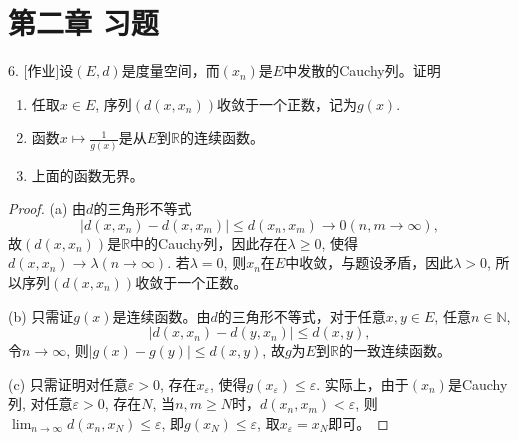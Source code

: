\documentclass[a4paper,8pt]{ctexart}\textwidth 140mm \textheight 216mm
\newtheorem{Def}{Def}[section]
\newcommand{\e}{\varepsilon}
\newcommand{\8}{\infty}
\begin{document}
\section{第二章 习题}
%
%

6. [作业]设$(E,d)$是度量空间，而$(x_n)$是$E$中发散的Cauchy列。证明
\begin{enumerate}
	\item[(a)] 任取$x\in E$, 序列$(d(x,x_n))$收敛于一个正数，记为$g(x)$.
	\item[(b)] 函数$x\mapsto \frac{1}{g(x)}$是从$E$到$\mathbb{R}$的连续函数。
	\item[(c)] 上面的函数无界。
\end{enumerate}
\begin{proof}
	(a) 由$d$的三角形不等式
	$$|d(x,x_n)-d(x,x_m)|\leq d(x_n,x_m)\to 0(n,m\to\infty),$$
	故$(d(x,x_n))$是$\mathbb{R}$中的Cauchy列，因此存在$\lambda\geq 0$, 使得$d(x,x_n)\to\lambda(n\to\infty)$. 若$\lambda=0$, 则$x_n$在$E$中收敛，与题设矛盾，因此$\lambda>0$, 所以序列$(d(x,x_n))$收敛于一个正数。
	
	(b) 只需证$g(x)$是连续函数。由$d$的三角形不等式，对于任意$x,y\in E$, 任意$n\in \mathbb{N}$, 
	$$|d(x,x_n)-d(y,x_n)|\leq d(x,y),$$
	令$n\to\infty$, 则$|g(x)-g(y)|\leq d(x,y)$, 故$g$为$E$到$\mathbb{R}$的一致连续函数。
	
	(c) 只需证明对任意$\e>0$, 存在$x_{\e}$, 使得$g(x_\e)\leq\e$. 实际上，由于$(x_n)$是Cauchy列, 对任意$\e>0$, 存在$N$, 当$n,m\geq N$时，$d(x_n,x_m)<\e$, 则$\lim_{n\to\infty}d(x_n,x_N)\leq \e$, 即$g(x_N)\leq \e$, 取$x_\e=x_N$即可。
\end{proof}
\end{document}
